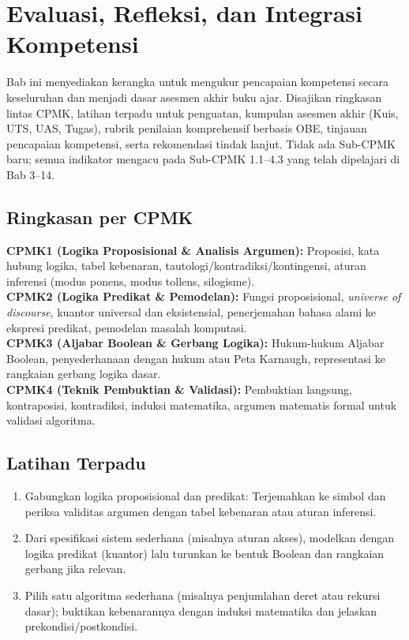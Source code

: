 \documentclass[../main]{subfiles}
\begin{document}
\chapter{Evaluasi, Refleksi, dan Integrasi Kompetensi}

Bab ini menyediakan kerangka untuk mengukur pencapaian kompetensi secara keseluruhan dan menjadi dasar asesmen akhir buku ajar. Disajikan ringkasan lintas CPMK, latihan terpadu untuk penguatan, kumpulan asesmen akhir (Kuis, UTS, UAS, Tugas), rubrik penilaian komprehensif berbasis OBE, tinjauan pencapaian kompetensi, serta rekomendasi tindak lanjut. Tidak ada Sub-CPMK baru; semua indikator mengacu pada Sub-CPMK 1.1--4.3 yang telah dipelajari di Bab 3--14.

\section*{Ringkasan per CPMK}

\textbf{CPMK1 (Logika Proposisional \& Analisis Argumen):} Proposisi, kata hubung logika, tabel kebenaran, tautologi/kontradiksi/kontingensi, aturan inferensi (modus ponens, modus tollens, silogisme).\\
\textbf{CPMK2 (Logika Predikat \& Pemodelan):} Fungsi proposisional, \textit{universe of discourse}, kuantor universal dan eksistensial, penerjemahan bahasa alami ke ekspresi predikat, pemodelan masalah komputasi.\\
\textbf{CPMK3 (Aljabar Boolean \& Gerbang Logika):} Hukum-hukum Aljabar Boolean, penyederhanaan dengan hukum atau Peta Karnaugh, representasi ke rangkaian gerbang logika dasar.\\
\textbf{CPMK4 (Teknik Pembuktian \& Validasi):} Pembuktian langsung, kontraposisi, kontradiksi, induksi matematika, argumen matematis formal untuk validasi algoritma.

\section*{Latihan Terpadu}

\begin{enumerate}
  \item Gabungkan logika proposisional dan predikat: Terjemahkan ke simbol dan periksa validitas argumen dengan tabel kebenaran atau aturan inferensi.
  \item Dari spesifikasi sistem sederhana (misalnya aturan akses), modelkan dengan logika predikat (kuantor) lalu turunkan ke bentuk Boolean dan rangkaian gerbang jika relevan.
  \item Pilih satu algoritma sederhana (misalnya penjumlahan deret atau rekursi dasar); buktikan kebenarannya dengan induksi matematika dan jelaskan prekondisi/postkondisi.
\end{enumerate}
\end{document}
